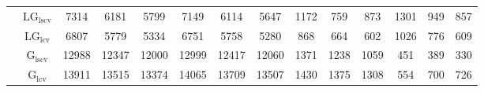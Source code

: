 \begin{table}[!ht]
{\begin{tabular}{@{}cc|ccc|ccc|ccc|ccc@{}}
 & $\mathrm{LG}_{\mathrm{lscv}}$ & 7314 & 6181 & 5799 & 7149 & 6114 & 5647 & 1172 & 759 & 873 & 1301 & 949 & 857 \\ 
 & $\mathrm{LG}_{\mathrm{lcv}}$ & 6807 & 5779 & 5334 & 6751 & 5758 & 5280 & \cellcolor{black!30}868 & \cellcolor{black!30}664 & \cellcolor{black!30}602 & 1026 & 776 & \cellcolor{black!10}609 \\ 
 & $\mathrm{G}_{\mathrm{lscv}}$ & 12988 & 12347 & 12000 & 12999 & 12417 & 12060 & 1371 & 1238 & 1059 & \cellcolor{black!30}451 & \cellcolor{black!30}389 & \cellcolor{black!30}330 \\ 
 & $\mathrm{G}_{\mathrm{lcv}}$ & 13911 & 13515 & 13374 & 14065 & 13709 & 13507 & 1430 & 1375 & 1308 & \cellcolor{black!10}554 & \cellcolor{black!10}700 & 726 \\ 
\bottomrule
\end{tabular}}
\end{table}
